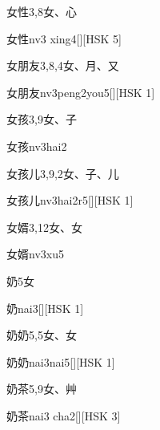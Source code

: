 \begin{entry}{女性}{3,8}{⼥、⼼}
  \begin{phonetics}{女性}{nv3 xing4}[][HSK 5]
  \end{phonetics}
\end{entry}

\begin{entry}{女朋友}{3,8,4}{⼥、⽉、⼜}
  \begin{phonetics}{女朋友}{nv3peng2you5}[][HSK 1]
  \end{phonetics}
\end{entry}

\begin{entry}{女孩}{3,9}{⼥、⼦}
  \begin{phonetics}{女孩}{nv3hai2}
  \end{phonetics}
\end{entry}

\begin{entry}{女孩儿}{3,9,2}{⼥、⼦、⼉}
  \begin{phonetics}{女孩儿}{nv3hai2r5}[][HSK 1]
  \end{phonetics}
\end{entry}

\begin{entry}{女婿}{3,12}{⼥、⼥}
  \begin{phonetics}{女婿}{nv3xu5}
  \end{phonetics}
\end{entry}

\begin{entry}{奶}{5}{⼥}
  \begin{phonetics}{奶}{nai3}[][HSK 1]
  \end{phonetics}
\end{entry}

\begin{entry}{奶奶}{5,5}{⼥、⼥}
  \begin{phonetics}{奶奶}{nai3nai5}[][HSK 1]
  \end{phonetics}
\end{entry}

\begin{entry}{奶茶}{5,9}{⼥、⾋}
  \begin{phonetics}{奶茶}{nai3 cha2}[][HSK 3]
  \end{phonetics}
\end{entry}

